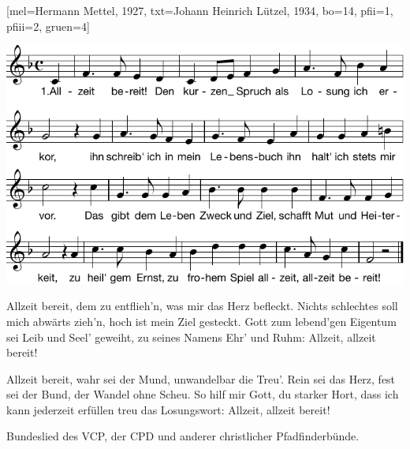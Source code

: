 [mel={Hermann Mettel, 1927}, txt={Johann Heinrich Lützel, 1934}, bo={14}, pfii={1}, pfiii={2}, gruen={4}]

\beginverse 
\endverse  
\centering\includegraphics[width=1\textwidth]{Noten/Lied003.pdf}	

\beginverse
Allzeit bereit, dem zu entflieh'n, was mir das Herz befleckt.
Nichts schlechtes soll mich abwärts zieh'n, hoch ist mein Ziel gesteckt.
Gott zum lebend'gen Eigentum sei Leib und Seel' geweiht,
zu seines Namens Ehr' und Ruhm: Allzeit, allzeit bereit!
\endverse

\beginverse
Allzeit bereit, wahr sei der Mund, unwandelbar die Treu'.
Rein sei das Herz, fest sei der Bund, der Wandel ohne Scheu.
So hilf mir Gott, du starker Hort, dass ich kann jederzeit
erfüllen treu das Losungswort: Allzeit, allzeit bereit!
\endverse

\endsong

\beginscripture{}
Bundeslied des VCP, der CPD und anderer christlicher Pfadfinderbünde.
\endscripture
